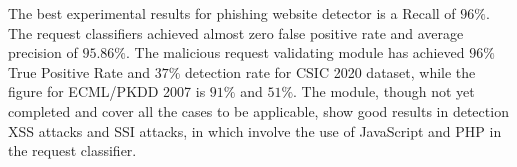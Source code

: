The best experimental results for phishing website detector is a Recall of $96\%$. The request classifiers achieved almost zero false positive rate and average precision of $95.86\%$. The malicious request validating module has achieved $96\%$ True Positive Rate and $37\%$ detection rate for CSIC 2020 dataset, while the figure for ECML/PKDD 2007 is $91\%$ and $51\%$. The module, though not yet completed and cover all the cases to be applicable, show good results in detection XSS attacks and SSI attacks, in which involve the use of JavaScript and PHP in the request classifier.
\cleardoublepage